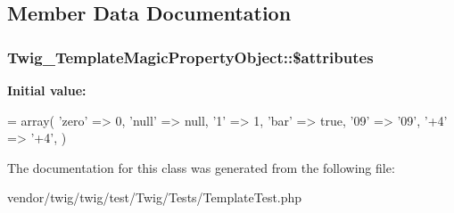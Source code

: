 \subsection{Member Data Documentation}
\subsubsection[{\texorpdfstring{\$attributes}{$attributes}}]{\setlength{\rightskip}{0pt plus 5cm}Twig\+\_\+\+Template\+Magic\+Property\+Object\+::\$attributes}\hypertarget{classTwig__TemplateMagicPropertyObject_aed65b86f61d5a016bcac17c06eb9b419}{}\label{classTwig__TemplateMagicPropertyObject_aed65b86f61d5a016bcac17c06eb9b419}
{\bfseries Initial value\+:}
\begin{DoxyCode}
= array(
        \textcolor{stringliteral}{'zero'} => 0,
        \textcolor{stringliteral}{'null'} => null,
        \textcolor{charliteral}{'1'} => 1,
        \textcolor{stringliteral}{'bar'} => \textcolor{keyword}{true},
        \textcolor{stringliteral}{'09'} => \textcolor{stringliteral}{'09'},
        \textcolor{stringliteral}{'+4'} => \textcolor{stringliteral}{'+4'},
    )
\end{DoxyCode}


The documentation for this class was generated from the following file\+:\begin{DoxyCompactItemize}
\item 
vendor/twig/twig/test/\+Twig/\+Tests/Template\+Test.\+php\end{DoxyCompactItemize}
